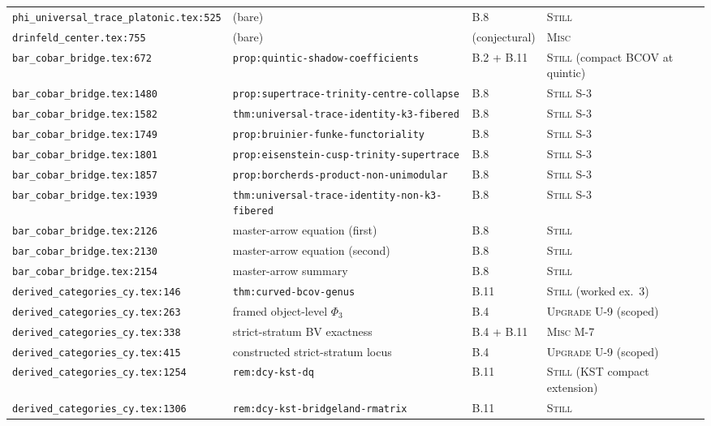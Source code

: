 \documentclass[11pt]{amsart}
\begin{document}
{{\begin{longtable}{@{}p{5.5cm}p{3cm}p{2cm}p{3.5cm}@{}}
\texttt{phi\_universal\_trace\_platonic.tex:525} & (bare) & B.8 & \textsc{Still} \\
\texttt{drinfeld\_center.tex:755} & (bare) & (conjectural) & \textsc{Misc} \\
\texttt{bar\_cobar\_bridge.tex:672} & \texttt{prop:quintic-shadow-coefficients} & B.2 + B.11 & \textsc{Still} (compact BCOV at quintic) \\
\texttt{bar\_cobar\_bridge.tex:1480} & \texttt{prop:supertrace-trinity-centre-collapse} & B.8 & \textsc{Still} S-3 \\
\texttt{bar\_cobar\_bridge.tex:1582} & \texttt{thm:universal-trace-identity-k3-fibered} & B.8 & \textsc{Still} S-3 \\
\texttt{bar\_cobar\_bridge.tex:1749} & \texttt{prop:bruinier-funke-functoriality} & B.8 & \textsc{Still} S-3 \\
\texttt{bar\_cobar\_bridge.tex:1801} & \texttt{prop:eisenstein-cusp-trinity-supertrace} & B.8 & \textsc{Still} S-3 \\
\texttt{bar\_cobar\_bridge.tex:1857} & \texttt{prop:borcherds-product-non-unimodular} & B.8 & \textsc{Still} S-3 \\
\texttt{bar\_cobar\_bridge.tex:1939} & \texttt{thm:universal-trace-identity-non-k3-fibered} & B.8 & \textsc{Still} S-3 \\
\texttt{bar\_cobar\_bridge.tex:2126} & master-arrow equation (first) & B.8 & \textsc{Still} \\
\texttt{bar\_cobar\_bridge.tex:2130} & master-arrow equation (second) & B.8 & \textsc{Still} \\
\texttt{bar\_cobar\_bridge.tex:2154} & master-arrow summary & B.8 & \textsc{Still} \\
\texttt{derived\_categories\_cy.tex:146} & \texttt{thm:curved-bcov-genus} & B.11 & \textsc{Still} (worked ex.\ 3) \\
\texttt{derived\_categories\_cy.tex:263} & framed object-level $\Phi_3$ & B.4 & \textsc{Upgrade} U-9 (scoped) \\
\texttt{derived\_categories\_cy.tex:338} & strict-stratum BV exactness & B.4 + B.11 & \textsc{Misc} M-7 \\
\texttt{derived\_categories\_cy.tex:415} & constructed strict-stratum locus & B.4 & \textsc{Upgrade} U-9 (scoped) \\
\texttt{derived\_categories\_cy.tex:1254} & \texttt{rem:dcy-kst-dq} & B.11 & \textsc{Still} (KST compact extension) \\
\texttt{derived\_categories\_cy.tex:1306} & \texttt{rem:dcy-kst-bridgeland-rmatrix} & B.11 & \textsc{Still} \\

\end{longtable}}}
\end{document}
